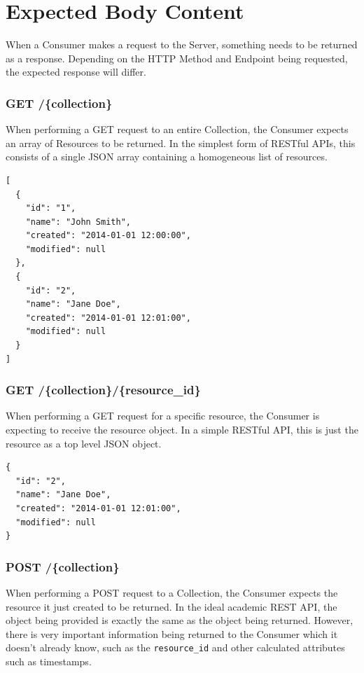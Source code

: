 \documentclass{book}
\begin{document}
\section{Expected Body Content}

When a Consumer makes a request to the Server, something needs to be returned as a response. Depending on the HTTP Method and Endpoint being requested, the expected response will differ.

\subsubsection{GET /\{collection\}}

When performing a GET request to an entire Collection, the Consumer expects an array of Resources to be returned. In the simplest form of RESTful APIs, this consists of a single JSON array containing a homogeneous list of resources.

\begin{verbatim}
[
  {
    "id": "1",
    "name": "John Smith",
    "created": "2014-01-01 12:00:00",
    "modified": null
  },
  {
    "id": "2",
    "name": "Jane Doe",
    "created": "2014-01-01 12:01:00",
    "modified": null
  }
]
\end{verbatim}

\subsubsection{GET /\{collection\}/\{resource\_id\}}

When performing a GET request for a specific resource, the Consumer is expecting to receive the resource object. In a simple RESTful API, this is just the resource as a top level JSON object.

\begin{verbatim}
{
  "id": "2",
  "name": "Jane Doe",
  "created": "2014-01-01 12:01:00",
  "modified": null
}
\end{verbatim}

\subsubsection{POST /\{collection\}}

When performing a POST request to a Collection, the Consumer expects the resource it just created to be returned. In the ideal academic REST API, the object being provided is exactly the same as the object being returned. However, there is very important information being returned to the Consumer which it doesn't already know, such as the \texttt{resource\_id} and other calculated attributes such as timestamps.
\end{document}
